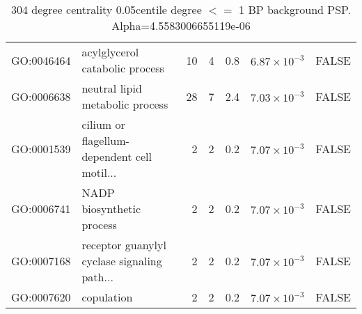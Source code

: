 \begin{table}[ht]
\begin{adjustbox}{max width=\textwidth}
\begin{tabular}{llrrrrl}
  GO:0046464 & acylglycerol catabolic process & 10 & 4 & 0.8 & $6.87 \times 10^{-3}$ & FALSE \\ 
  GO:0006638 & neutral lipid metabolic process & 28 & 7 & 2.4 & $7.03 \times 10^{-3}$ & FALSE \\ 
  GO:0001539 & cilium or flagellum-dependent cell motil... & 2 & 2 & 0.2 & $7.07 \times 10^{-3}$ & FALSE \\ 
  GO:0006741 & NADP biosynthetic process & 2 & 2 & 0.2 & $7.07 \times 10^{-3}$ & FALSE \\ 
  GO:0007168 & receptor guanylyl cyclase signaling path... & 2 & 2 & 0.2 & $7.07 \times 10^{-3}$ & FALSE \\ 
  GO:0007620 & copulation & 2 & 2 & 0.2 & $7.07 \times 10^{-3}$ & FALSE \\ 
   \hline
\end{tabular}
\end{adjustbox}
\caption{304 degree centrality 0.05centile degree $<=$ 1 BP background PSP. Alpha=4.5583006655119e-06} 
\label{tab:304 degree centrality 0.05centile  1 BP background PSP. Alpha=4.5583006655119e-06}
\end{table}



